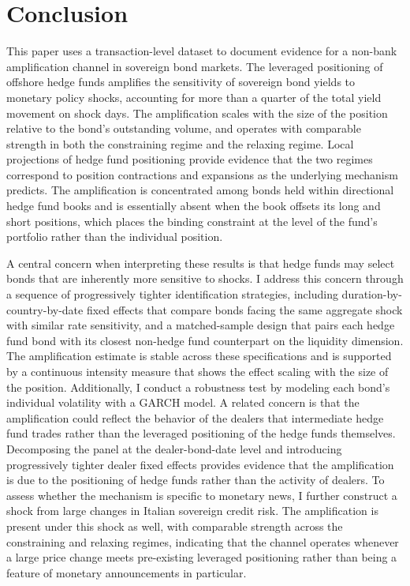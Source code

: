 \documentclass[english, 11pt, oneside]{article}
\begin{document}
\section{Conclusion}
\label{sec:conclusion}
This paper uses a transaction-level dataset to document evidence for a non-bank amplification channel in sovereign bond markets. The leveraged positioning of offshore hedge funds amplifies the sensitivity of sovereign bond yields to monetary policy shocks, accounting for more than a quarter of the total yield movement on shock days. The amplification scales with the size of the position relative to the bond's outstanding volume, and operates with comparable strength in both the constraining regime and the relaxing regime. Local projections of hedge fund positioning provide evidence that the two regimes correspond to position contractions and expansions as the underlying mechanism predicts. The amplification is concentrated among bonds held within directional hedge fund books and is essentially absent when the book offsets its long and short positions, which places the binding constraint at the level of the fund's portfolio rather than the individual position.

A central concern when interpreting these results is that hedge funds may select bonds that are inherently more sensitive to shocks. I address this concern through a sequence of progressively tighter identification strategies, including duration-by-country-by-date fixed effects that compare bonds facing the same aggregate shock with similar rate sensitivity, and a matched-sample design that pairs each hedge fund bond with its closest non-hedge fund counterpart on the liquidity dimension. The amplification estimate is stable across these specifications and is supported by a continuous intensity measure that shows the effect scaling with the size of the position. Additionally, I conduct a robustness test by modeling each bond's individual volatility with a GARCH model. A related concern is that the amplification could reflect the behavior of the dealers that intermediate hedge fund trades rather than the leveraged positioning of the hedge funds themselves. Decomposing the panel at the dealer-bond-date level and introducing progressively tighter dealer fixed effects provides evidence that the amplification is due to the positioning of hedge funds rather than the activity of dealers. To assess whether the mechanism is specific to monetary news, I further construct a shock from large changes in Italian sovereign credit risk. The amplification is present under this shock as well, with comparable strength across the constraining and relaxing regimes, indicating that the channel operates whenever a large price change meets pre-existing leveraged positioning rather than being a feature of monetary announcements in particular. 
\end{document}
